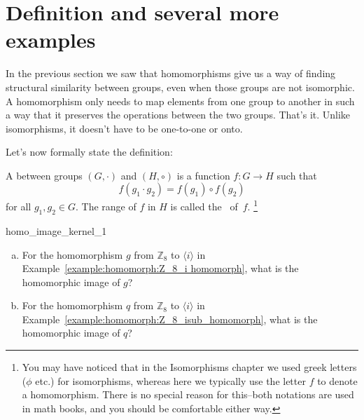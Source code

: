 \section{Definition and several more examples}\label{sec:homomorph:several}

In  the previous section we saw that homomorphisms give us a way of finding structural similarity between groups, even when those groups are not isomorphic.  A homomorphism only needs to  map elements from one group to another in such a way that it preserves the operations between the two groups.  That's it. Unlike isomorphisms, it doesn't have to be one-to-one or onto.  

Let's now formally state the definition:

\begin{defn} \label{homomorphism_def}
A
 between groups $(G, \cdot)$ and $(H, \circ)$ is a function $f :
G \rightarrow H$ such that  
\[
f( g_1 \cdot g_2 ) = f( g_1 ) \circ f( g_2 )
\]
for all $g_1, g_2 \in G$. The range of $f$ in $H$ is called the ~of~$f$.
\footnote{You may have noticed that in the Isomorphisms chapter we used greek letters ($\phi$ etc.) for isomorphisms, whereas here we typically use the  letter $f$ to denote a homomorphism. There is no special reason for this--both notations are used in math books, and you should be comfortable either way.}
 \end{defn}

\begin{exercise}{homo_image_kernel_1}

\begin{enumerate}[(a)]
\item
For the homomorphism $g$ from ${\mathbb Z}_8$ to $\langle i \rangle$ in Example~\ref{example:homomorph:Z_8_i homomorph}, what is the homomorphic image of $g$?
\item
For the homomorphism $q$ from ${\mathbb Z}_8$ to $\langle i \rangle$ in Example~\ref{example:homomorph:Z_8_isub_homomorph}, what is the homomorphic image of $q$?
\end{enumerate}
\end{exercise}  
 
 
